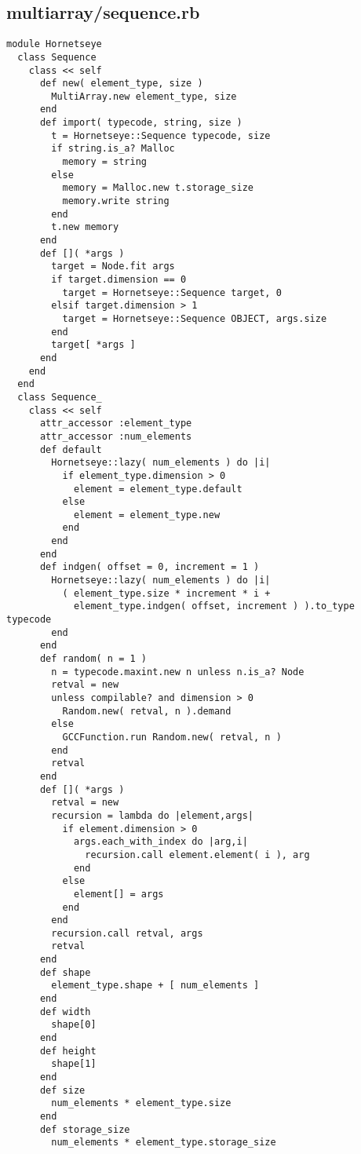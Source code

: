 \subsection{multiarray/sequence.rb}\label{cha:multiarray-sequence-rb}
\begin{lstlisting}
module Hornetseye
  class Sequence
    class << self
      def new( element_type, size )
        MultiArray.new element_type, size
      end
      def import( typecode, string, size )
        t = Hornetseye::Sequence typecode, size
        if string.is_a? Malloc
          memory = string
        else
          memory = Malloc.new t.storage_size
          memory.write string
        end
        t.new memory
      end
      def []( *args )
        target = Node.fit args
        if target.dimension == 0
          target = Hornetseye::Sequence target, 0
        elsif target.dimension > 1
          target = Hornetseye::Sequence OBJECT, args.size
        end
        target[ *args ]
      end
    end
  end
  class Sequence_
    class << self
      attr_accessor :element_type
      attr_accessor :num_elements
      def default
        Hornetseye::lazy( num_elements ) do |i|
          if element_type.dimension > 0
            element = element_type.default
          else
            element = element_type.new
          end
        end
      end
      def indgen( offset = 0, increment = 1 )
        Hornetseye::lazy( num_elements ) do |i|
          ( element_type.size * increment * i +
            element_type.indgen( offset, increment ) ).to_type typecode
        end
      end
      def random( n = 1 )
        n = typecode.maxint.new n unless n.is_a? Node
        retval = new
        unless compilable? and dimension > 0
          Random.new( retval, n ).demand
        else
          GCCFunction.run Random.new( retval, n )
        end
        retval
      end
      def []( *args )
        retval = new
        recursion = lambda do |element,args|
          if element.dimension > 0
            args.each_with_index do |arg,i|
              recursion.call element.element( i ), arg
            end
          else
            element[] = args
          end
        end
        recursion.call retval, args
        retval
      end
      def shape
        element_type.shape + [ num_elements ]
      end
      def width
        shape[0]
      end
      def height
        shape[1]
      end
      def size
        num_elements * element_type.size
      end
      def storage_size
        num_elements * element_type.storage_size

\end{lstlisting}
